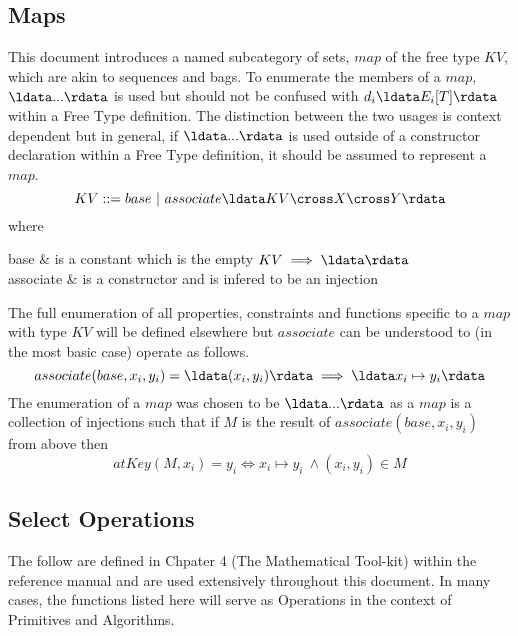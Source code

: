 \documentclass[../main.tex]{subfiles}
\begin{document}
\subsection{Maps}
This document introduces a named subcategory of sets, $map$ of the free type $KV$,
which are akin to sequences and bags. To enumerate the members of a $map$, $\ldata ... \rdata$ is used
but should not be confused with $d_{i}\ldata E_{i}[T]\rdata$ within a Free Type definition. The
distinction between the two usages is context dependent but in general, if $\ldata ... \rdata$
is used outside of a constructor declaration within a Free Type definition,
it should be assumed to represent a $map$.
$$KV ::= base ~| ~associate\ldata KV \cross X \cross Y \rdata$$
where
\begin{argue}
  base & is a constant which is the empty $KV \implies \ldata \rdata$ \\
  associate & is a constructor and is infered to be an injection
\end{argue}
The full enumeration of all properties, constraints and functions
specific to a $map$ with type $KV$ will be defined elsewhere but
$associate$ can be understood to (in the most basic case) operate as follows.
$$associate(base, x_{i}, y_{i}) = \ldata (x_{i}, y_{i}) \rdata \implies \ldata x_{i} \mapsto y_{i} \rdata$$
The enumeration of a $map$ was chosen to be $\ldata ... \rdata$ as a $map$ is a collection of injections
such that if $M$ is the result of $associate(base, x_{i}, y_{i})$ from above then
$$atKey(M, x_{i}) = y_{i} \iff x_{i} \mapsto y_{i} ~\land (x_{i}, y_{i}) \in M$$

\subsection{Select Operations}
The follow are defined in Chpater 4 (The Mathematical Tool-kit) within the reference manual
and are used extensively throughout this document. In many cases, the functions listed here
will serve as Operations in the context of Primitives and Algorithms.
\end{document}

